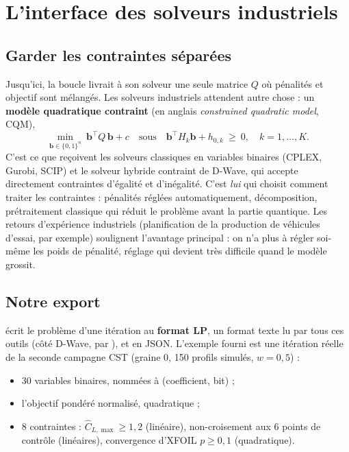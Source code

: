 \chapter{L'interface des solveurs industriels}\label{ch:cqm}

\section{Garder les contraintes séparées}
Jusqu'ici, la boucle livrait à son solveur une seule matrice $Q$ où pénalités et objectif sont mélangés. Les solveurs industriels attendent autre chose : un \textbf{modèle quadratique contraint} (en anglais \emph{constrained quadratic model}, CQM),
\[ \min_{\mathbf b\in\{0,1\}^n}\ \mathbf b^\top Q\,\mathbf b+c\quad\text{sous}\quad\mathbf b^\top H_k\mathbf b+h_{0,k}\ \ge\ 0,\quad k=1,\dots,K. \]
C'est ce que reçoivent les solveurs classiques en variables binaires (CPLEX, Gurobi, SCIP) et le solveur hybride contraint de D-Wave, qui accepte directement contraintes d'égalité et d'inégalité. C'est \emph{lui} qui choisit comment traiter les contraintes : pénalités réglées automatiquement, décomposition, prétraitement classique qui réduit le problème avant la partie quantique. Les retours d'expérience industriels (planification de la production de véhicules d'essai, par exemple) soulignent l'avantage principal : on n'a plus à régler soi-même les poids de pénalité, réglage qui devient très difficile quand le modèle grossit.

\section{Notre export}
 écrit le problème d'une itération au \textbf{format LP}, un format texte lu par tous ces outils (côté D-Wave, par ), et en JSON. L'exemple fourni est une itération réelle de la seconde campagne CST (graine 0, 150 profils simulés, $w=0{,}5$) :
\begin{itemize}
\item 30 variables binaires, nommées  à  (coefficient, bit) ;
\item l'objectif pondéré normalisé, quadratique ;
\item 8 contraintes : $\hat C_{L,\max}\ge1{,}2$ (linéaire), non-croisement aux 6 points de contrôle (linéaires), convergence d'XFOIL $p\ge0{,}1$ (quadratique).
\end{itemize}

